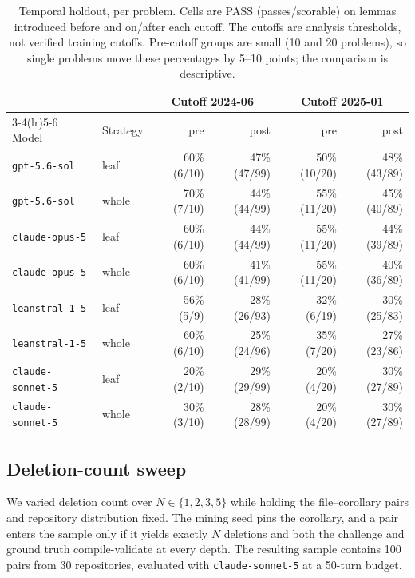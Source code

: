 \documentclass{article}
\begin{document}
\begin{table}[h]
  \caption{Temporal holdout, per problem. Cells are PASS (passes/scorable) on lemmas
  introduced before and on/after each cutoff. The cutoffs are analysis thresholds, not
  verified training cutoffs. Pre-cutoff groups are small (10 and 20 problems), so single
  problems move these percentages by 5--10 points; the comparison is descriptive.}
  \label{tab:temporal}
  \centering
  \small
  \begin{tabular}{llrrrr}
    \toprule
    & & \multicolumn{2}{c}{Cutoff 2024-06} & \multicolumn{2}{c}{Cutoff 2025-01} \\
    \cmidrule(lr){3-4}\cmidrule(lr){5-6}
    Model & Strategy & pre & post & pre & post \\
    \midrule
    \texttt{gpt-5.6-sol} & leaf & 60\% (6/10) & 47\% (47/99) & 50\% (10/20) & 48\% (43/89) \\
    \texttt{gpt-5.6-sol} & whole & 70\% (7/10) & 44\% (44/99) & 55\% (11/20) & 45\% (40/89) \\
    \texttt{claude-opus-5} & leaf & 60\% (6/10) & 44\% (44/99) & 55\% (11/20) & 44\% (39/89) \\
    \texttt{claude-opus-5} & whole & 60\% (6/10) & 41\% (41/99) & 55\% (11/20) & 40\% (36/89) \\
    \texttt{leanstral-1-5} & leaf & 56\% (5/9) & 28\% (26/93) & 32\% (6/19) & 30\% (25/83) \\
    \texttt{leanstral-1-5} & whole & 60\% (6/10) & 25\% (24/96) & 35\% (7/20) & 27\% (23/86) \\
    \texttt{claude-sonnet-5} & leaf & 20\% (2/10) & 29\% (29/99) & 20\% (4/20) & 30\% (27/89) \\
    \texttt{claude-sonnet-5} & whole & 30\% (3/10) & 28\% (28/99) & 20\% (4/20) & 30\% (27/89) \\
    \bottomrule
  \end{tabular}
\end{table}

\subsection{Deletion-count sweep}
\label{sec:sweep}

We varied deletion count over $N \in \{1,2,3,5\}$ while holding the file--corollary pairs
and repository distribution fixed. The mining seed pins the corollary, and a pair enters
the sample only if it yields exactly $N$ deletions and both the challenge and ground truth
compile-validate at every depth. The resulting sample contains 100 pairs from 30
repositories, evaluated with \texttt{claude-sonnet-5} at a 50-turn budget.
\end{document}
